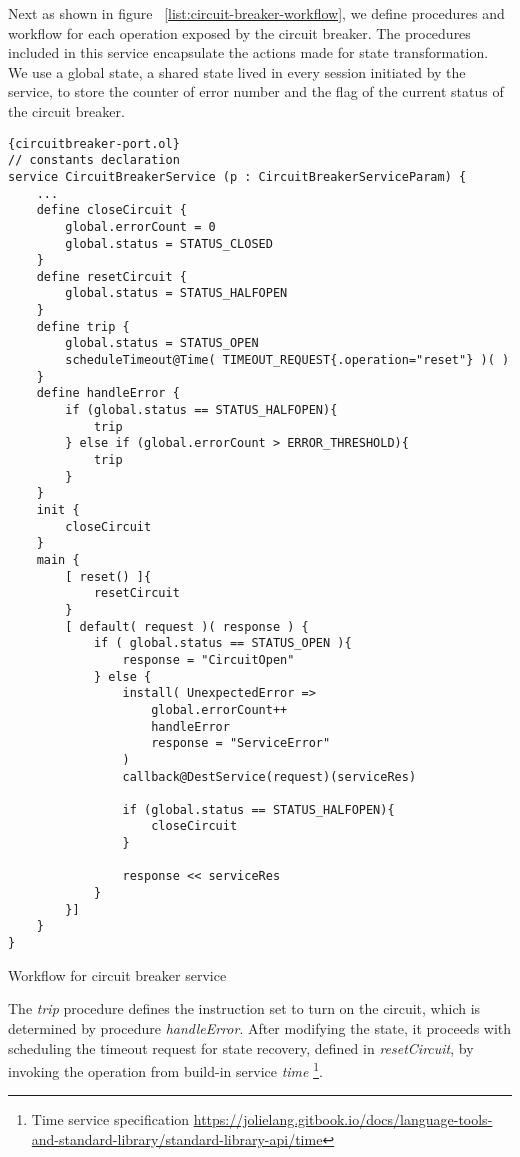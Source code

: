 Next as shown in figure ~\ref{list:circuit-breaker-workflow}, we define procedures and workflow for each operation exposed by the circuit breaker. The procedures included in this service encapsulate the actions made for state transformation. We use a global state, a shared state lived in every session initiated by the service, to store the counter of error number and the flag of the current status of the circuit breaker.

\begin{listing}[]
    \centering
    \lstset{language=Jolie,
        style=codeStyle,
        basicstyle=\ttfamily\footnotesize
    }
\begin{lstlisting}[frame=tlrb]{circuitbreaker-port.ol}
// constants declaration
service CircuitBreakerService (p : CircuitBreakerServiceParam) {
    ...
    define closeCircuit {
        global.errorCount = 0
        global.status = STATUS_CLOSED
    }
    define resetCircuit {
        global.status = STATUS_HALFOPEN
    }
    define trip {
        global.status = STATUS_OPEN
        scheduleTimeout@Time( TIMEOUT_REQUEST{.operation="reset"} )( )
    }
    define handleError {
        if (global.status == STATUS_HALFOPEN){
            trip
        } else if (global.errorCount > ERROR_THRESHOLD){
            trip
        }
    }
    init {
        closeCircuit
    }
    main {        
        [ reset() ]{
            resetCircuit
        }
        [ default( request )( response ) {
            if ( global.status == STATUS_OPEN ){
                response = "CircuitOpen"
            } else {
                install( UnexpectedError =>
                    global.errorCount++
                    handleError
                    response = "ServiceError"
                )
                callback@DestService(request)(serviceRes)

                if (global.status == STATUS_HALFOPEN){
                    closeCircuit
                }

                response << serviceRes
            }
        }]
    }
}
\end{lstlisting}
\caption{Workflow for circuit breaker service}
\label{list:circuit-breaker-workflow}
\end{listing}

The \textit{trip} procedure defines the instruction set to turn on the circuit, which is determined by procedure \textit{handleError}. After modifying the state, it proceeds with scheduling the timeout request for state recovery, defined in \textit{resetCircuit}, by invoking the operation from build-in service \textit{time}
\footnote{Time service specification \url{https://jolielang.gitbook.io/docs/language-tools-and-standard-library/standard-library-api/time}}.

